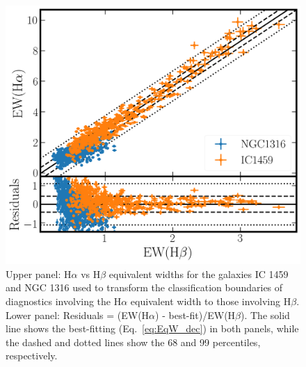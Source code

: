 \documentclass[a4paper,fleqn,usenatbib]{mnras}
\newcommand{\bracket}[1]{[#1]} %
\begin{document}
	\begin{figure}
		\includegraphics[width=\columnwidth]{EQw_fit.png}
		\caption[Comparing H$\alpha$ and H$\beta$ equivalent widths]{Upper panel: H$\alpha$ vs H$\beta$ equivalent widths for the galaxies IC 1459 and NGC 1316 used to transform the classification boundaries of diagnostics involving the H$\alpha$ equivalent width to those involving H$\beta$. Lower panel: Residuals = (EW(H$\alpha$) - best-fit)/EW(H$\beta$). The solid line shows the best-fitting (Eq.\ \ref{eq:EqW_dec}) in both panels, while the dashed and dotted lines show the 68 and 99 percentiles, respectively.}
		\label{fig:EqW_relation}
	\end{figure}

\end{document}
